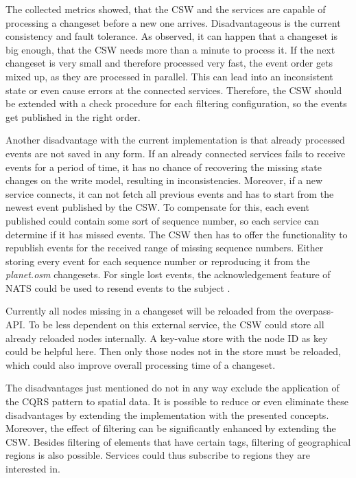 \documentclass[conference]{IEEEtran}
\begin{document}
The collected metrics showed, that the CSW and the services are capable of processing a changeset before a new one arrives. Disadvantageous is the current consistency and fault tolerance. As observed, it can happen that a changeset is big enough, that the CSW needs more than a minute to process it. If the next changeset is very small and therefore processed very fast, the event order gets mixed up, as they are processed in parallel. This can lead into an inconsistent state or even cause errors at the connected services. Therefore, the CSW should be extended with a check procedure for each filtering configuration, so the events get published in the right order.

Another disadvantage with the current implementation is that already processed events are not saved in any form. If an already connected services fails to receive events for a period of time, it has no chance of recovering the missing state changes on the write model, resulting in inconsistencies. Moreover, if a new service connects, it can not fetch all previous events and has to start from the newest event published by the CSW. To compensate for this, each event published could contain some sort of sequence number, so each service can determine if it has missed events. The CSW then has to offer the functionality to republish events for the received range of missing sequence numbers. Either storing every event for each sequence number or reproducing it from the \textit{planet.osm} changesets. For single lost events, the acknowledgement feature of NATS could be used to resend events to the subject \cite{noauthor_acknowledgements_nodate}.

Currently all nodes missing in a changeset will be reloaded from the overpass-API. To be less dependent on this external service, the CSW could store all already reloaded nodes internally. A key-value store with the node ID as key could be helpful here. Then only those nodes not in the store must be reloaded, which could also improve overall processing time of a changeset. 

The disadvantages just mentioned do not in any way exclude the application of the CQRS pattern to spatial data. It is possible to reduce or even eliminate these disadvantages by extending the implementation with the presented concepts. Moreover, the effect of filtering can be significantly enhanced by extending the CSW. Besides filtering of elements that have certain tags, filtering of geographical regions is also possible. Services could thus subscribe to regions they are interested in.
\end{document}
